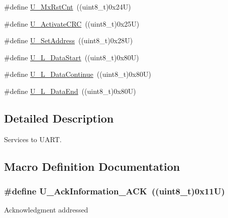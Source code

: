 \begin{DoxyCompactItemize}
\item 
\#define \hyperlink{group___u_a_r_t___control___to_ga8898cd82315a21d0365c60b05a9450f9}{U\+\_\+\+Mx\+Rst\+Cnt}~((uint8\+\_\+t)0x24\+U)
\item 
\#define \hyperlink{group___u_a_r_t___control___to_gaa8801c2c6b23ad1b63c85b6f04b08c6d}{U\+\_\+\+Activate\+C\+RC}~((uint8\+\_\+t)0x25\+U)
\item 
\#define \hyperlink{group___u_a_r_t___control___to_ga1b727950a6079fa1f299e08204ad8923}{U\+\_\+\+Set\+Address}~((uint8\+\_\+t)0x28\+U)
\item 
\#define \hyperlink{group___u_a_r_t___control___to_ga5a6fadacef419bffab0a2ad00d4a4a3a}{U\+\_\+\+L\+\_\+\+Data\+Start}~((uint8\+\_\+t)0x80\+U)
\item 
\#define \hyperlink{group___u_a_r_t___control___to_ga2e3fb33682715cbda34c2a576259b955}{U\+\_\+\+L\+\_\+\+Data\+Continue}~((uint8\+\_\+t)0x80\+U)
\item 
\#define \hyperlink{group___u_a_r_t___control___to_gaf314a3afc396db4fa556d4246907814e}{U\+\_\+\+L\+\_\+\+Data\+End}~((uint8\+\_\+t)0x80\+U)
\end{DoxyCompactItemize}


\subsection{Detailed Description}
Services to U\+A\+RT. 



\subsection{Macro Definition Documentation}
\subsubsection[{\texorpdfstring{U\+\_\+\+Ack\+Information\+\_\+\+A\+CK}{U_AckInformation_ACK}}]{\setlength{\rightskip}{0pt plus 5cm}\#define U\+\_\+\+Ack\+Information\+\_\+\+A\+CK~((uint8\+\_\+t)0x11\+U)}\hypertarget{group___u_a_r_t___control___to_gae8d1e40bf2415207f384e3fdd134c844}{}\label{group___u_a_r_t___control___to_gae8d1e40bf2415207f384e3fdd134c844}
Acknowledgment addressed 
